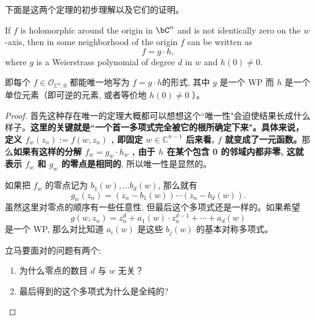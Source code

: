\documentclass[lang=cn,12pt,fontset=none,a4paper]{beautybook}
\begin{document}
下面是这两个定理的初步理解以及它们的证明。
\begin{theorem}
   If $f$ is holomorphic around the origin in $\bC^n$ and is not identically zero on the $w$-axis, then in some neighborhood of the origin $f$ can be written as 
   \[f=g\cdot h,\]
   where $g$ is a Weierstrass polynomial of degree $d$ in $w$ and $h(0)\neq 0$.

   即每个 $f \in \mathcal{O}_{\mathbb{C}^n, 0}$ 都能唯一地写为 $f=g \cdot h$的形式, 其中 $g$ 是一个 WP 而 $h$ 是一个单位元素（即可逆的元素, 或者等价地 $h(0) \neq 0$ ）。
\end{theorem}
   \begin{proof}


首先这种存在唯一的定理大概都可以想想这个``唯一性"会迫使结果长成什么样子。\textbf{这里的关键就是``一个首一多项式完全被它的根所确定下来"。具体来说，定义 $f_w\left(z_n\right):=f\left(w, z_n\right)$ , 即固定 $w \in \mathbb{C}^{n-1}$ 后来看, $f$ 就变成了一元函数。}那么\textbf{如果有这样的分解 $f_w=g_w \cdot h_w$ , 由于 $h$ 在某个包含 0 的邻域内都非零, 这就表示 $f_w$ 和 $g_w$ 的零点是相同的}, 所以唯一性是显然的。

如果把 $f_w$ 的零点记为 $b_1(w), \ldots b_d(w)$, 那么就有 $$g_w\left(z_n\right)=\left(z_n-b_1(w)\right) \cdots\left(z_n-b_d(w)\right).$$ 虽然这里对零点的顺序有一些任意性, 但最后这个多项式还是一样的。如果希望 $$g\left(w, z_n\right)=z_n^d+a_1(w) \cdot z_n^{d-1}+\cdots+a_d(w)$$ 是一个 WP, 那么对比知道 $a_i(w)$ 是这些 $b_j(w)$ 的基本对称多项式。

立马要面对的问题有两个: 
\begin{fancybox}
\begin{enumerate}
   \item 为什么零点的数目 $d$ 与 $w$ 无关？
   \item 最后得到的这个多项式为什么是全纯的? 
\end{enumerate}
\end{fancybox}


\end{proof}
\end{document}
